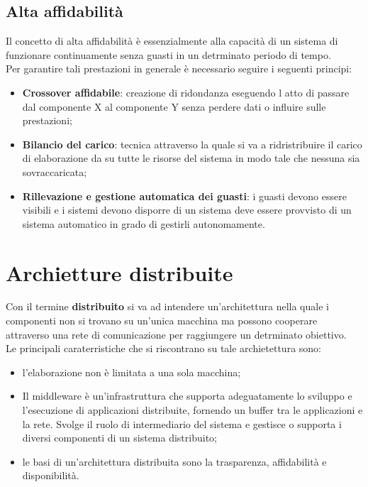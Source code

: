 \documentclass{article}
\begin{document}
\subsection{Alta affidabilità}
Il concetto di alta affidabilità è essenzialmente alla capacità di un sistema di funzionare continuamente senza guasti in un detrminato periodo di tempo.\\
Per garantire tali prestazioni in generale è necessario seguire i seguenti principi:
\begin{itemize}
    \item \textbf{Crossover affidabile}: creazione di ridondanza eseguendo l atto di passare dal componente X al componente Y senza perdere dati o influire sulle prestazioni;
    \item \textbf{Bilancio del carico}:
    tecnica attraverso  la quale si va a ridristribuire
    il carico di elaborazione da su tutte le risorse del sistema in modo tale che nessuna sia sovraccaricata;
    \item \textbf{Rillevazione e gestione automatica dei guasti}:
    i guasti devono essere visibili e i  sistemi devono disporre di un sistema deve essere provvisto di un sistema automatico in grado di gestirli autonomamente.
\end{itemize}
\section{Archietture distribuite}
Con il termine \textbf{distribuito} si va ad intendere un'architettura nella quale i componenti non si trovano su un'unica macchina ma possono cooperare attraverso una rete di comunicazione per raggiungere un detrminato obiettivo.
\\Le principali caraterristiche che si riscontrano su tale archietettura sono:
\begin{itemize}
    \item l'elaborazione non è limitata a una sola macchina;
    \item Il middleware è un'infrastruttura che supporta adeguatamente lo sviluppo e l'esecuzione di applicazioni distribuite, fornendo un buffer tra le applicazioni e la rete. Svolge il ruolo di intermediario del sistema e gestisce o supporta i diversi componenti di un sistema distribuito;
    \item le basi di un'architettura distribuita sono la  trasparenza, affidabilità e disponibilità.
\end{itemize}
\end{document}
